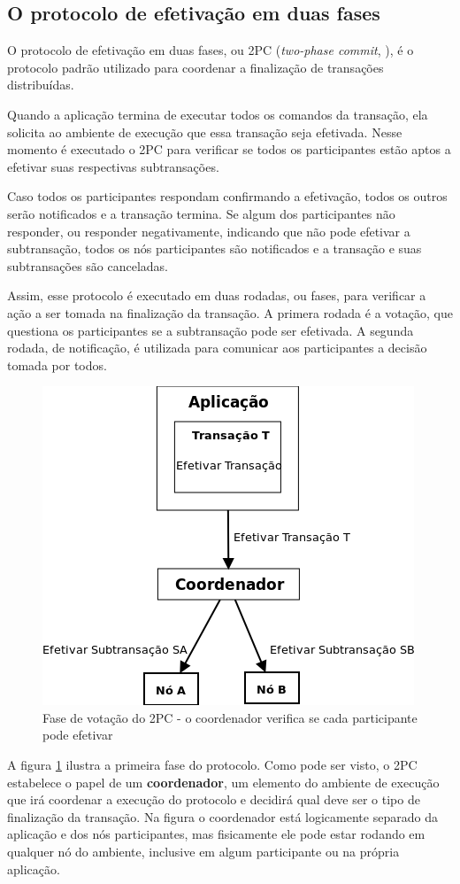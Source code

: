 \documentclass[11pt,twoside,a4paper]{book}
\begin{document}
\subsection{O protocolo de efetivação em duas fases}
\label{subsec:2pc}
O protocolo de efetivação em duas fases, ou 2PC (\emph{two-phase commit}, \cite{2pc}), é o protocolo padrão utilizado para coordenar a finalização de transações distribuídas.

Quando a aplicação termina de executar todos os comandos da transação, ela solicita ao ambiente de execução que essa transação seja efetivada. Nesse momento é executado o 2PC para verificar se todos os participantes estão aptos a efetivar suas respectivas subtransações.

Caso todos os participantes respondam confirmando a efetivação, todos os outros serão notificados e a transação termina. Se algum dos participantes não responder, ou responder negativamente, indicando que não pode efetivar a subtransação, todos os nós participantes são notificados e a transação e suas subtransações são canceladas.

Assim, esse protocolo é executado em duas rodadas, ou fases, para verificar a ação a ser tomada na finalização da transação. A primera rodada é a votação, que questiona os participantes se a subtransação pode ser efetivada. A segunda rodada, de notificação, é utilizada para comunicar aos participantes a decisão tomada por todos.

\begin{figure}
  \centering
  \includegraphics[width=.50\textwidth]{fase_votacao_2pc} 
  \caption{Fase de votação do 2PC - o coordenador verifica se cada participante pode efetivar}
  \label{fig:fase_votacao_2pc} 
\end{figure}

A figura \ref{fig:fase_votacao_2pc} ilustra a primeira fase do protocolo. Como pode ser visto, o 2PC estabelece o papel de um \textbf{coordenador}, um elemento do ambiente de execução que irá coordenar a execução do protocolo e decidirá qual deve ser o tipo de finalização da transação. Na figura o coordenador está logicamente separado da aplicação e dos nós participantes, mas fisicamente ele pode estar rodando em qualquer nó do ambiente, inclusive em algum participante ou na própria aplicação.
\end{document}
